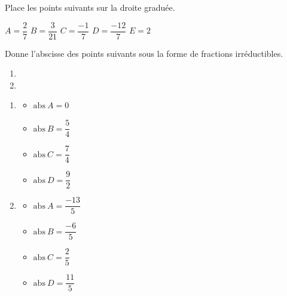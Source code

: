 \begin{exercise}
  Place les points suivants sur la droite graduée.
  \begin{center}
    $A=\dfrac{2}{7}$
    \hfil $B=\dfrac{3}{21}$
    \hfil $C=\dfrac{-1}{7}$
    \hfil $D=\dfrac{-12}{7}$
    \hfil $E=2$
    \medbreak
    
  \end{center}
\end{exercise}
\begin{solution}
  \begin{center}
    
  \end{center}
  \newpage
\end{solution}

\begin{exercise}
  Donne l'abscisse des points suivants sous la forme de fractions irréductibles.
  \begin{enumerate}
    \item 
    \item 
  \end{enumerate}
\end{exercise}
\begin{solution}
  \begin{enumerate}[cols=2]
    \item
          \begin{itemize}[label=]
            \item $\mathrm{abs}~A = 0$
            \item $\mathrm{abs}~B = \dfrac{5}{4}$
            \item $\mathrm{abs}~C = \dfrac{7}{4}$
            \item $\mathrm{abs}~D = \dfrac{9}{2}$
          \end{itemize}
    \item
          \begin{itemize}[label=]
            \item $\mathrm{abs}~A = \dfrac{-13}{5}$
            \item $\mathrm{abs}~B = \dfrac{-6}{5}$
            \item $\mathrm{abs}~C = \dfrac{2}{5}$
            \item $\mathrm{abs}~D = \dfrac{11}{5}$
          \end{itemize}
  \end{enumerate}
\end{solution}

